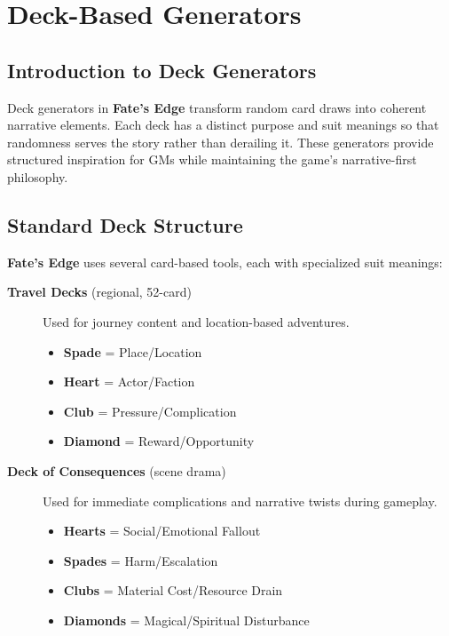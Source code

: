 \chapter{Deck-Based Generators}
\label{chap:deck-generators}

\section{Introduction to Deck Generators}
\label{sec:deck-intro}

 Deck generators in \textbf{Fate's Edge} transform random card draws into coherent narrative elements. Each deck has a distinct purpose and suit meanings so that randomness serves the story rather than derailing it. These generators provide structured inspiration for GMs while maintaining the game's narrative-first philosophy.

\section{Standard Deck Structure}
\label{sec:deck-structure}

\textbf{Fate's Edge} uses several card-based tools, each with specialized suit meanings:

\begin{description}
\item[\textbf{Travel Decks} (regional, 52-card)]  Used for journey content and location-based adventures.
\begin{itemize}
    \item \textbf{Spade} = Place/Location
    \item \textbf{Heart} = Actor/Faction
    \item \textbf{Club} = Pressure/Complication
    \item \textbf{Diamond} = Reward/Opportunity
\end{itemize}

\item[\textbf{Deck of Consequences} (scene drama)]  Used for immediate complications and narrative twists during gameplay.
\begin{itemize}
    \item \textbf{Hearts} = Social/Emotional Fallout
    \item \textbf{Spades} = Harm/Escalation
    \item \textbf{Clubs} = Material Cost/Resource Drain
    \item \textbf{Diamonds} = Magical/Spiritual Disturbance
\end{itemize}
\end{description}

